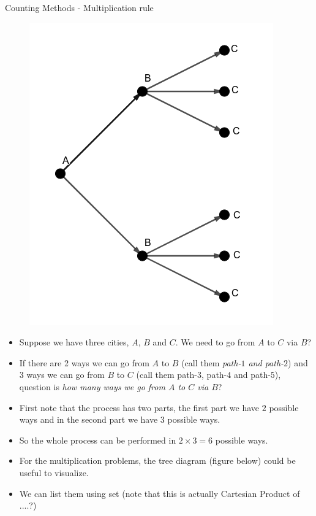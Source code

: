 \documentclass[8pt,usepdftitle=false]{beamer}
\begin{document}
\begin{frame}[allowframebreaks]{Counting Methods - Multiplication rule}
\begin{itemize}
\begin{figure}[H]
\centering
\includegraphics[scale = .3]{Images/tree_diagram_1.png}
\end{figure}

\begin{itemize}

\item Suppose we have three cities, $A$, $B$ and $C$. We need to go from $A$ to $C$ via $B$?  
\item If there are 2 ways we can go from $A$ to $B$ (call them \emph{path-$1$ and path-$2$}) and $3$ ways we can go from $B$ to $C$ (call them \alert{path-$3$, path-$4$ and path-$5$}), question is \emph{how many ways we go from $A$ to $C$ via $B$}? 
\item First note that the process has two parts, the first part we have \alert{$2$ possible ways} and in the second part we have \alert{$3$ possible ways}.
\item So the whole process can be performed in  $2 \times 3 = 6$ possible ways.   
\item For the multiplication problems, the tree diagram (figure below) could be useful to visualize.
\item We can list them using set (note that this is actually Cartesian Product of ....?)
\vspace*{-.4cm}


\end{itemize}
\end{itemize}
\end{frame}
\end{document}
